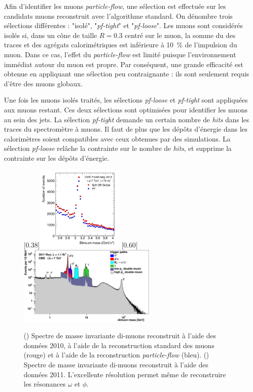 Afin d'identifier les muons \emph{particle-flow}, une sélection est effectuée sur les candidats muons reconstruit avec l'algorithme standard. On dénombre trois sélections différentes : "isolé", "\emph{pf-tight}" et "\emph{pf-loose}". Les muons sont considérés isolés si, dans un cône de taille $R = \num{0.3}$ centré sur le muon, la somme du \pt des traces et des agrégats calorimétriques est inférieure à \SI{10}{\%} de l'impulsion du muon. Dans ce cas, l'effet du \emph{particle-flow} est limité puisque l'environnement immédiat autour du muon est propre. Par conséquent, une grande efficacité est obtenue en appliquant une sélection peu contraignante : ils sont seulement requis d'être des muons globaux.

Une fois les muons isolés traités, les sélections \emph{pf-loose} et \emph{pf-tight} sont appliquées aux muons restant. Ces deux sélections sont optimisées pour identifier les muons au sein des jets. La sélection \emph{pf-tight} demande un certain nombre de \emph{hits} dans les traces du spectromètre à muons. Il faut de plus que les dépôts d'énergie dans les calorimètres soient compatibles avec ceux obtenues par des simulations. La sélection \emph{pf-loose} relâche la contrainte sur le nombre de \emph{hits}, et supprime la contrainte sur les dépôts d'énergie.

\begin{figure}[tbp]
    \centering
    \subcaptionbox{\label{fig:dimu_jpsi}}[0.38\textwidth]{\includegraphics[width=0.38\textwidth]{chapitre3/figs/muons_jspi_mass.pdf}} \hfill
    \subcaptionbox{\label{fig:dimu_mass}}[0.60\textwidth]{\includegraphics[width=0.60\textwidth]{chapitre3/figs/mass_dimu.pdf}}
    \caption{() Spectre de masse invariante di-muons reconstruit à l'aide des données 2010, à l'aide de la reconstruction standard des muons (rouge) et à l'aide de la reconstruction \emph{particle-flow} (bleu). () Spectre de masse invariante di-muons reconstruit à l'aide des données 2011. L'excellente résolution permet même de reconstruire les résonances $\omega$ et $\phi$.}
    \label{fig:dimu_mass_spectrum}
\end{figure}

